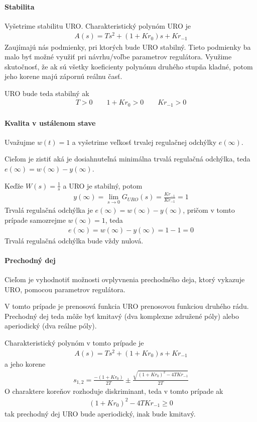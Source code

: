 \documentclass[a4paper, 10pt, ]{article}
\begin{document}
\paragraph{Stabilita}
Vyšetrime stabilitu URO. Charakteristický polynóm URO je
\begin{align}
    A(s) = Ts^2+  (1 + K r_0) s + Kr_{-1}
\end{align}
Zaujímajú nás podmienky, pri ktorých bude URO stabilný. Tieto podmienky ba malo byť možné využiť pri návrhu/voľbe parametrov regulátora. Využime skutočnosť, že ak sú všetky koeficienty polynómu druhého stupňa kladné, potom jeho korene majú zápornú reálnu časť.

URO bude teda stabilný ak
\begin{align}
    T>0 \qquad 1+K r_0 >0 \qquad K r_{-1} > 0
\end{align}


\paragraph{Kvalita v ustálenom stave}
Uvažujme $w(t) = 1$ a vyšetrime veľkosť trvalej regulačnej odchýlky $e(\infty)$.

Cieľom je zistiť aká je dosiahnuteľná minimálna trvalá regulačná odchýlka, teda  $e(\infty) = w(\infty) - y(\infty)$.

Keďže $W(s) = \frac{1}{s}$ a URO je stabilný, potom
\begin{align}
    y(\infty) = \lim_{s\to0} G_{URO}(s) = \frac{K r_{-1}}{K r_{-1}} = 1
\end{align}
Trvalá regulačná odchýlka je $e(\infty) = w(\infty) - y(\infty)$, pričom v tomto prípade samozrejme $ w(\infty) = 1$, teda
\begin{align}
    e(\infty)
    = w(\infty) - y(\infty)
    = 1 - 1
    = 0
\end{align}
Trvalá regulačná odchýlka bude vždy nulová.


\paragraph{Prechodný dej}
Cieľom je vyhodnotiť možnosti ovplyvnenia prechodného deja, ktorý vykazuje URO, pomocou parametrov regulátora.

V tomto prípade je prenosová funkcia URO prenosovou funkciou druhého rádu. Prechodný dej teda môže byť kmitavý (dva komplexne združené póly) alebo aperiodický (dva reálne póly).

Charakteristický polynóm v tomto prípade je
\begin{align}
    A(s)  =  Ts^2+  (1 + K r_0) s + Kr_{-1}
\end{align}
a jeho korene
\begin{align}
    s_{1,2} = \frac{-(1+K r_0)}{2T} \pm \frac{ \sqrt{(1+K r_0)^2 - 4TKr_{-1} }}{2T}
\end{align}
O charaktere koreňov rozhoduje diskriminant, teda v tomto prípade ak
\begin{align}
     (1+K r_0)^2 - 4TKr_{-1} \geq 0
\end{align}
tak prechodný dej URO bude aperiodický, inak bude kmitavý.
\end{document}
